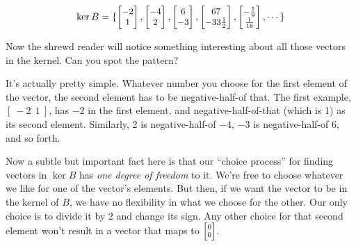 \vspace{-.15in}
\begin{align*}
\ker B =
\small
\{
\begin{bmatrix}
-2 \\ 1 \\
\end{bmatrix}, 
\begin{bmatrix}
-4 \\ 2 \\
\end{bmatrix}, 
\begin{bmatrix}
6 \\ -3 \\
\end{bmatrix}, 
\begin{bmatrix}
67 \\ -33\frac{1}{2} \\
\end{bmatrix}, 
\begin{bmatrix}
-\frac{1}{9} \\ \frac{1}{18} \\
\end{bmatrix}, \cdots \} \\
\end{align*}
\normalsize
\vspace{-.15in}

Now the shrewd reader will notice something interesting about all those vectors
in the kernel. Can you spot the pattern?

It's actually pretty simple. Whatever number you choose for the first element
of the vector, the second element has to be negative-half-of that. The first
example, $[\ -2\ \ 1\ ]$, has $-2$ in the first element, and
negative-half-of-that (which is 1) as its second element. Similarly, 2 is
negative-half-of $-4$, $-3$ is negative-half-of 6, and so forth.


Now a subtle but important fact here is that our ``choice process'' for finding
vectors in $\ker B$ has \textit{one degree of freedom} to it. We're free to
choose whatever we like for one of the vector's elements. But then, if we want
the vector to be in the kernel of $B$, we have no flexibility in what we choose
for the other. Our only choice is to divide it by 2 and change its
sign. Any other choice for that second element won't result in a vector that
maps to ${\scriptsize \begin{bmatrix} 0 \\ 0 \end{bmatrix}}$.

